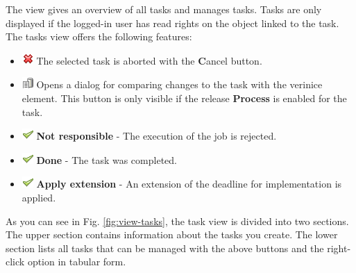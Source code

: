 \documentclass[a4paper,10pt]{book}
\begin{document}
The view gives an overview of all tasks and manages tasks. Tasks are
only displayed if the logged-in user has read rights on the object
linked to the task.  The tasks view offers the following
features:
\begin{itemize}
  \item \includegraphics[height=2ex]{Icon/Nein.png} The selected task is aborted with the {\textbf Cancel} button.
  \item \includegraphics[height=2ex]{Icon/history_rep.png} Opens a
    dialog for comparing changes to the task with the verinice
    element. This button is only visible if the release
    \textbf{Process} is enabled for the task.
  \item \includegraphics[height=2ex]{Icon/16-em-check.png} \textbf{Not
      responsible} - The execution of the job is rejected.
  \item \includegraphics[height=2ex]{Icon/16-em-check.png} \textbf{Done}
    - The task was completed.
  \item \includegraphics[height=2ex]{Icon/16-em-check.png} \textbf{Apply
      extension} - An extension of the deadline for implementation is
    applied.
\end{itemize}
As you can see in Fig. \ref{fig:view-tasks}, the task view is divided
into two sections. The upper section contains information about the
tasks you create. The lower section lists all tasks that can be
managed with the above buttons and the right-click option in tabular
form.
\end{document}
